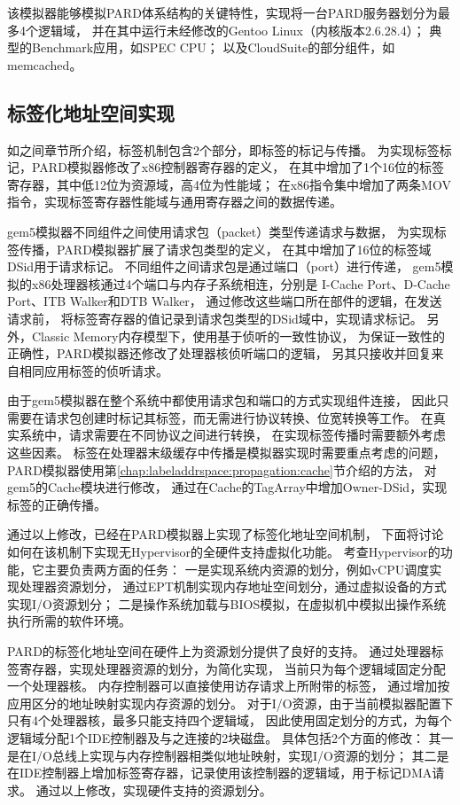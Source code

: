 该模拟器能够模拟PARD体系结构的关键特性，实现将一台PARD服务器划分为最多4个逻辑域，
并在其中运行未经修改的Gentoo Linux（内核版本2.6.28.4）；
典型的Benchmark应用，如SPEC CPU\cite{cpu2006}；
以及CloudSuite\cite{Ferdman:2012:cloudsuite}的部分组件，如memcached\cite{memcached}。


\subsection{标签化地址空间实现}
\label{chap:labeladdrspace:simimpl}

如之间章节所介绍，标签机制包含2个部分，即标签的标记与传播。
为实现标签标记，PARD模拟器修改了x86控制器寄存器的定义，
在其中增加了1个16位的标签寄存器，其中低12位为资源域，高4位为性能域；
在x86指令集中增加了两条MOV指令，实现标签寄存器性能域与通用寄存器之间的数据传递。

gem5模拟器不同组件之间使用请求包（packet）类型传递请求与数据，
为实现标签传播，PARD模拟器扩展了请求包类型的定义，
在其中增加了16位的标签域DSid用于请求标记。
不同组件之间请求包是通过端口（port）进行传递，
gem5模拟的x86处理器核通过4个端口与内存子系统相连，分别是
I-Cache Port、D-Cache Port、ITB Walker和DTB Walker，
通过修改这些端口所在部件的逻辑，在发送请求前，
将标签寄存器的值记录到请求包类型的DSid域中，实现请求标记。
另外，Classic Memory内存模型下，使用基于侦听的一致性协议，
为保证一致性的正确性，PARD模拟器还修改了处理器核侦听端口的逻辑，
另其只接收并回复来自相同应用标签的侦听请求。

由于gem5模拟器在整个系统中都使用请求包和端口的方式实现组件连接，
因此只需要在请求包创建时标记其标签，而无需进行协议转换、位宽转换等工作。
在真实系统中，请求需要在不同协议之间进行转换，
在实现标签传播时需要额外考虑这些因素。
标签在处理器末级缓存中传播是模拟器实现时需要重点考虑的问题，
PARD模拟器使用第\ref{chap:labeladdrspace:propagation:cache}节介绍的方法，
对gem5的Cache模块进行修改，
通过在Cache的TagArray中增加Owner-DSid，实现标签的正确传播。


通过以上修改，已经在PARD模拟器上实现了标签化地址空间机制，
下面将讨论如何在该机制下实现无Hypervisor的全硬件支持虚拟化功能。
考查Hypervisor的功能，它主要负责两方面的任务：
一是实现系统内资源的划分，例如vCPU调度实现处理器资源划分，
通过EPT机制实现内存地址空间划分，通过虚拟设备的方式实现I/O资源划分；
二是操作系统加载与BIOS模拟，在虚拟机中模拟出操作系统执行所需的软件环境。

PARD的标签化地址空间在硬件上为资源划分提供了良好的支持。
通过处理器标签寄存器，实现处理器资源的划分，为简化实现，
当前只为每个逻辑域固定分配一个处理器核。
内存控制器可以直接使用访存请求上所附带的标签，
通过增加按应用区分的地址映射实现内存资源的划分。
对于I/O资源，由于当前模拟器配置下只有4个处理器核，最多只能支持四个逻辑域，
因此使用固定划分的方式，为每个逻辑域分配1个IDE控制器及与之连接的2块磁盘。
具体包括2个方面的修改：
其一是在I/O总线上实现与内存控制器相类似地址映射，实现I/O资源的划分；
其二是在IDE控制器上增加标签寄存器，记录使用该控制器的逻辑域，用于标记DMA请求。
通过以上修改，实现硬件支持的资源划分。


